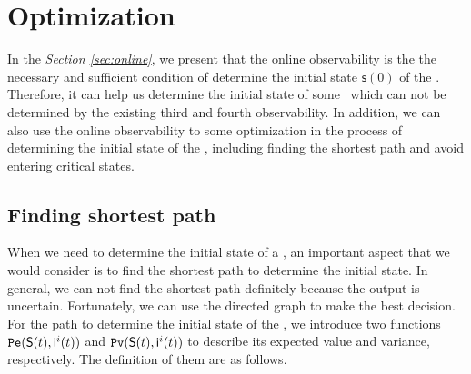 \section{Optimization}
\label{sec:app}

In the {\em Section \ref{sec:online}}, we present that the online observability is the the necessary and sufficient condition of determine the initial state $\mathsf{s}(0)$ of the \BCNs. Therefore, it can help us determine the initial state of some \BCNs\ which can not be determined by the existing third and fourth observability. In addition, we can also use the online observability to some optimization in the process of determining the initial state of the \BCNs, including finding the shortest path and avoid entering critical states. %


\subsection{Finding shortest path}
When we need to determine the initial state of a \BCN, an important aspect that we would consider is to find the shortest path to determine the initial state. In general, we can not find the shortest path definitely because the output is uncertain. Fortunately, we can use the directed graph to make the best decision. For the path to determine the initial state of the \BCNs, we introduce two functions ${\tt Pe}(\mathsf{S}(t),\mathsf{ i}^{i}(t))$ and ${\tt Pv}(\mathsf{S}(t),\mathsf{ i}^{i}(t))$ to describe its expected value and variance, respectively. The definition of them are as follows.



